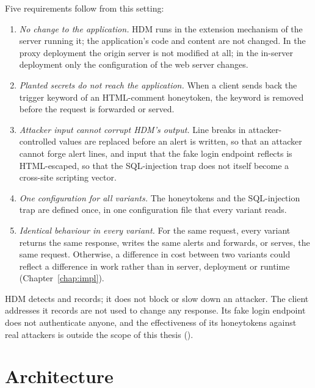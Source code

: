 \documentclass{rptuma}
\begin{document}
Five requirements follow from this setting:
\begin{enumerate}[label=\textbf{R\arabic*}]
  \item \emph{No change to the application.} HDM runs in the extension mechanism of the server
    running it; the application's code and content are not changed. In the proxy deployment the
    origin server is not modified at all; in the in-server deployment only the configuration of
    the web server changes.
  \item \emph{Planted secrets do not reach the application.} When a client sends back the trigger
    keyword of an HTML-comment honeytoken, the keyword is removed before the request is
    forwarded or served.
  \item \emph{Attacker input cannot corrupt HDM's output.} Line breaks in attacker-controlled
    values are replaced before an alert is written, so that an attacker cannot forge alert
    lines, and input that the fake login endpoint reflects is HTML-escaped, so that the SQL-injection trap
    does not itself become a cross-site scripting vector.
  \item \emph{One configuration for all variants.} The honeytokens and the SQL-injection trap are defined once,
    in one configuration file that every variant reads.
  \item \emph{Identical behaviour in every variant.} For the same request, every variant returns
    the same response, writes the same alerts and forwards, or serves, the same request.
    Otherwise, a difference in cost between two variants could reflect a difference in work
    rather than in server, deployment or runtime (Chapter~\ref{chap:impl}).
\end{enumerate}

HDM detects and records; it does not block or slow down an attacker. The client addresses it
records are not used to change any response. Its fake login endpoint does not authenticate anyone,
and the effectiveness of its honeytokens against real attackers is outside the scope of this
thesis ().

\section{Architecture}
\label{sec:design.arch}
\end{document}
